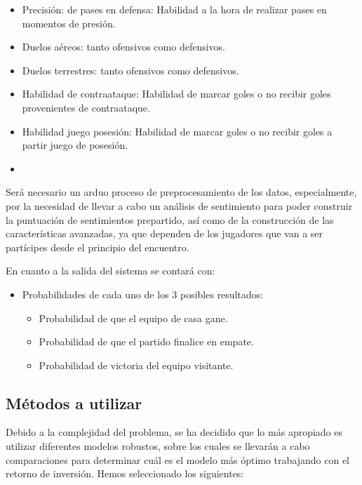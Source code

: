 \begin{enumerate}
\begin{itemize}
        \item Precisión: de pases en defensa: Habilidad a la hora de realizar pases en momentos de presión.
        \item Duelos aéreos: tanto ofensivos como defensivos.
        \item Duelos terrestres: tanto ofensivos como defensivos.
        \item Habilidad de contraataque: Habilidad de marcar goles o no recibir goles provenientes de contraataque.
        \item Habilidad juego posesión: Habilidad de marcar goles o no recibir goles a partir juego de posesión.
        \item 
    \end{itemize}
\end{enumerate}

Será necesario un arduo proceso de preprocesamiento de los datos, especialmente, por la necesidad de llevar a cabo un análisis de sentimiento para poder construir la puntuación de sentimientos prepartido, así como de la construcción de las características avanzadas, ya que dependen de los jugadores que van a ser partícipes desde el principio del encuentro.

En cuanto a la salida del sistema se contará con:

\begin{itemize}
    \item Probabilidades de cada uno de los 3 posibles resultados:
    \begin{itemize}
        \item Probabilidad de que el equipo de casa gane.
        \item Probabilidad de que el partido finalice en empate.
        \item Probabilidad de victoria del equipo visitante.
    \end{itemize}
\end{itemize}

\subsection{Métodos a utilizar}

Debido a la complejidad del problema, se ha decidido que lo más apropiado es utilizar diferentes modelos robustos, sobre los cuales se llevarán a cabo comparaciones para determinar cuál es el modelo más óptimo trabajando con el retorno de inversión. Hemos seleccionado los siguientes:

